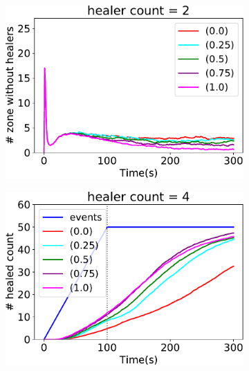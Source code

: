 \begin{figure}
\begin{subfigure}[b]{0.32\textwidth}
\includegraphics[width=\textwidth]{papers/mdpi2020/imgs/empty-zone-2.pdf}
\end{subfigure}
\par\bigskip %
\centering
\begin{subfigure}[b]{0.32\textwidth}
\centering
\includegraphics[width=\textwidth]{papers/mdpi2020/imgs/healed-4.pdf}
\end{subfigure}
\hfill
%
\begin{subfigure}[b]{0.32\textwidth}
\centering

\end{subfigure}
\end{figure}
